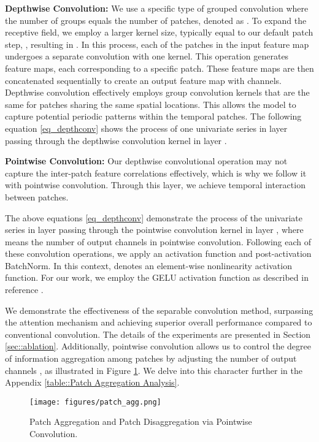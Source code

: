 \documentclass{article} \usepackage{iclr2024_conference,times}
\begin{document}
\textbf{Depthwise Convolution:} We use a specific type of grouped convolution where the number of groups equals the number of patches, denoted as . To expand the receptive field, we employ a larger kernel size, typically equal to our default patch step, , resulting in . In this process, each of the  patches in the input feature map undergoes a separate convolution with one kernel. This operation generates  feature maps, each corresponding to a specific patch. These feature maps are then concatenated sequentially to create an output feature map with  channels. Depthwise convolution effectively employs group convolution kernels that are the same for patches sharing the same spatial locations. This allows the model to capture potential periodic patterns within the temporal patches. The following equation \ref{eq_depthconv} shows the process of one univariate series  in layer  passing through the depthwise convolution kernel in layer .

\textbf{Pointwise Convolution:} Our depthwise convolutional operation may not capture the inter-patch feature correlations effectively, which is why we follow it with pointwise convolution. Through this layer, we achieve temporal interaction between patches. 


The above equations \ref{eq_depthconv} demonstrate the process of the univariate series  in layer  passing through the pointwise convolution kernel in layer , where  means the number of output channels in pointwise convolution. Following each of these convolution operations, we apply an activation function and post-activation BatchNorm. In this context,  denotes an element-wise nonlinearity activation function. For our work, we employ the GELU activation function as described in reference \citep{gelu}.

We demonstrate the effectiveness of the separable convolution method, surpassing the attention mechanism and achieving superior overall performance compared to conventional convolution. The details of the experiments are presented in Section \ref{sec::ablation}. Additionally, pointwise convolution allows us to control the degree of information aggregation among patches by adjusting the number of output channels , as illustrated in Figure \ref{fig::patch_agg}. We delve into this character further in the Appendix \ref{table::Patch Aggregation Analysis}. 



\begin{figure}[h]
\begin{center}
\texttt{[image: figures/patch\_agg.png]}
\end{center}
\caption{Patch Aggregation and Patch Disaggregation via Pointwise Convolution.}
\label{fig::patch_agg}
\end{figure}
\end{document}
